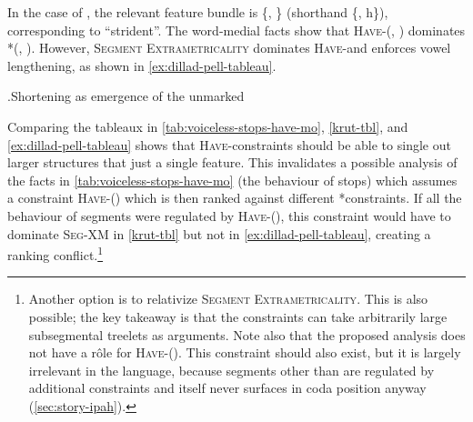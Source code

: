 In the case of \ipa{[s~ʃ~ɬ]}, the relevant feature bundle is \{, \} (shorthand \{, h\}), corresponding to  \enquote{strident}. The word-medial facts show that \textsc{Have}-\mo(, ) dominates *\mo(, ). However, \textsc{Segment Extrametricality} dominates \textsc{Have}-\mo and enforces vowel lengthening, as shown in \ref{ex:dillad-pell-tableau}.

\ex.\label{ex:dillad-pell-tableau}Shortening as emergence of the unmarked\\


Comparing the tableaux in \cref{tab:voiceless-stops-have-mo}, \cref{krut-tbl}, and \ref{ex:dillad-pell-tableau} shows that \textsc{Have}-\mo constraints should be able to single out larger structures that just a single feature. This invalidates a possible analysis of the facts in \cref{tab:voiceless-stops-have-mo} (\ie the behaviour of stops) which assumes a constraint \textsc{Have}-\mo() which is then ranked against different *\mo constraints. If all the behaviour of  segments were regulated by \textsc{Have}-\mo(), this constraint would have to dominate \textsc{Seg-XM} in \ref{krut-tbl} but not in \ref{ex:dillad-pell-tableau}, creating a ranking conflict.\footnote{Another option is to relativize \textsc{Segment Extrametricality}. This is also possible; the key takeaway is that the constraints can take arbitrarily large subsegmental treelets as arguments. Note also that the proposed analysis does not have a rôle for \textsc{Have}-\mo(). This constraint should also exist, but it is largely irrelevant in the language, because  segments other than \ipa{[h]} are regulated by additional constraints and \ipa{[h]} itself never surfaces in coda position anyway (\cref{sec:story-ipah}).}

